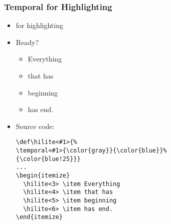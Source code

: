 \begin{frame}[fragile]
\frametitle{Temporal for Highlighting}%

  \begin{itemize}
    \item {\color{Violet}} for highlighting
    \item Ready?\\
      \begin{itemize}
         \item Everything
         \item that has
         \item beginning
         \item has end.
      \end{itemize}
    \item Source code:\\
      \begin{scriptsize}
        \begin{verbatim}
\def\hilite<#1>{%
\temporal<#1>{\color{gray}}{\color{blue}}%
{\color{blue!25}}}
...
\begin{itemize}
  \hilite<3> \item Everything
  \hilite<4> \item that has
  \hilite<5> \item beginning
  \hilite<6> \item has end.
\end{itemize}
        \end{verbatim}
      \end{scriptsize}
  \end{itemize}

\end{frame}
